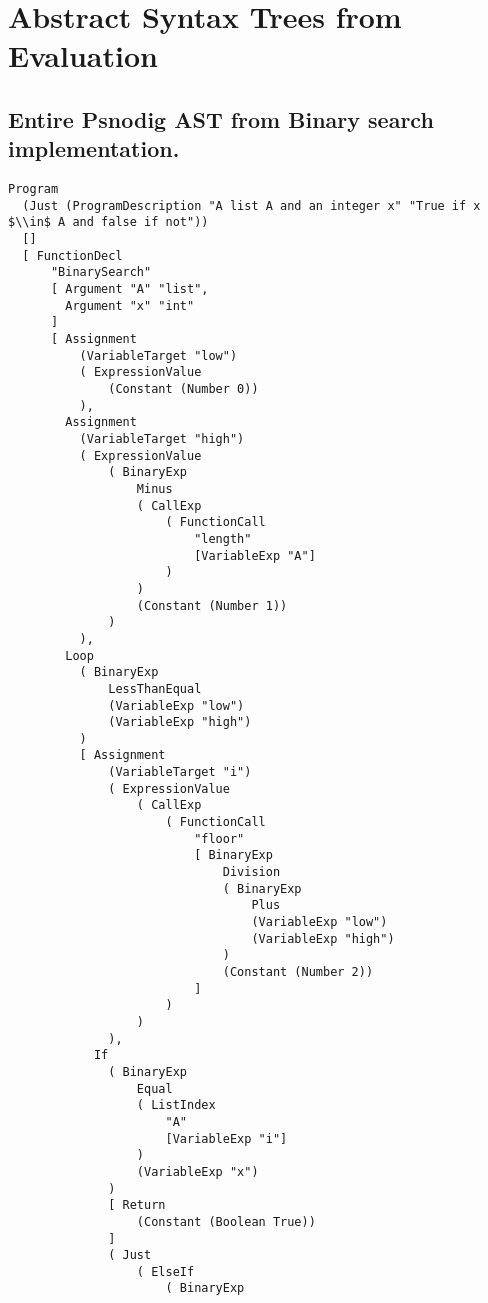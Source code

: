 \chapter{Abstract Syntax Trees from Evaluation}
\label{appendixA}

\section{Entire Psnodig AST from Binary search implementation.}
\label{appendix:Entire Psnodig AST from Binary search implementation.}

\begin{lstlisting}
Program
  (Just (ProgramDescription "A list A and an integer x" "True if x $\\in$ A and false if not"))
  []
  [ FunctionDecl
      "BinarySearch"
      [ Argument "A" "list",
        Argument "x" "int"
      ]
      [ Assignment
          (VariableTarget "low")
          ( ExpressionValue
              (Constant (Number 0))
          ),
        Assignment
          (VariableTarget "high")
          ( ExpressionValue
              ( BinaryExp
                  Minus
                  ( CallExp
                      ( FunctionCall
                          "length"
                          [VariableExp "A"]
                      )
                  )
                  (Constant (Number 1))
              )
          ),
        Loop
          ( BinaryExp
              LessThanEqual
              (VariableExp "low")
              (VariableExp "high")
          )
          [ Assignment
              (VariableTarget "i")
              ( ExpressionValue
                  ( CallExp
                      ( FunctionCall
                          "floor"
                          [ BinaryExp
                              Division
                              ( BinaryExp
                                  Plus
                                  (VariableExp "low")
                                  (VariableExp "high")
                              )
                              (Constant (Number 2))
                          ]
                      )
                  )
              ),
            If
              ( BinaryExp
                  Equal
                  ( ListIndex
                      "A"
                      [VariableExp "i"]
                  )
                  (VariableExp "x")
              )
              [ Return
                  (Constant (Boolean True))
              ]
              ( Just
                  ( ElseIf
                      ( BinaryExp

\end{lstlisting}
